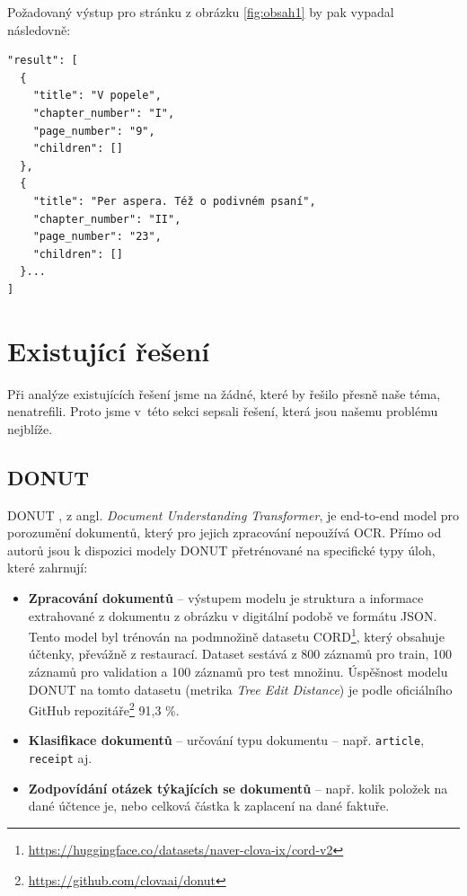 \documentclass{article}
\begin{document}
Požadovaný výstup pro stránku z obrázku \ref{fig:obsah1} by pak vypadal následovně:

\begin{verbatim}
"result": [
  {
    "title": "V popele",
    "chapter_number": "I",
    "page_number": "9",
    "children": []
  },
  {
    "title": "Per aspera. Též o podivném psaní",
    "chapter_number": "II",
    "page_number": "23",
    "children": []
  }...
]
\end{verbatim}

\section{Existující řešení}
\label{existing_models}

Při analýze existujících řešení jsme na žádné, které by řešilo přesně naše téma, nenatrefili. Proto jsme v~této sekci sepsali řešení, která jsou našemu problému nejblíže.

\subsection{DONUT}

DONUT \cite{donut}, z angl. \textit{Document Understanding Transformer}, je end-to-end model pro porozumění dokumentů, který pro jejich zpracování nepoužívá OCR. Přímo od autorů jsou k dispozici modely DONUT přetrénované na specifické typy úloh, které zahrnují:

\begin{itemize}
\item{\textbf{Zpracování dokumentů}} -- výstupem modelu je struktura a informace extrahované z dokumentu z obrázku v digitální podobě ve formátu JSON. Tento model byl trénován na podmnožině datasetu CORD\footnote{\url{https://huggingface.co/datasets/naver-clova-ix/cord-v2}}, který obsahuje účtenky, převážně z restaurací. Dataset sestává z 800 záznamů pro train, 100 záznamů pro validation a 100 záznamů pro test množinu. Úspěšnost modelu DONUT na tomto datasetu (metrika \textit{Tree Edit Distance}) je podle oficiálního GitHub repozitáře\footnote{\url{https://github.com/clovaai/donut}} 91,3 \%.


\item{\textbf{Klasifikace dokumentů}} -- určování typu dokumentu -- např. \verb|article|, \verb|receipt| aj.

\item{\textbf{Zodpovídání otázek týkajících se dokumentů}} -- např. kolik položek na dané účtence je, nebo celková částka k zaplacení na dané faktuře.
\end{itemize}
\end{document}
